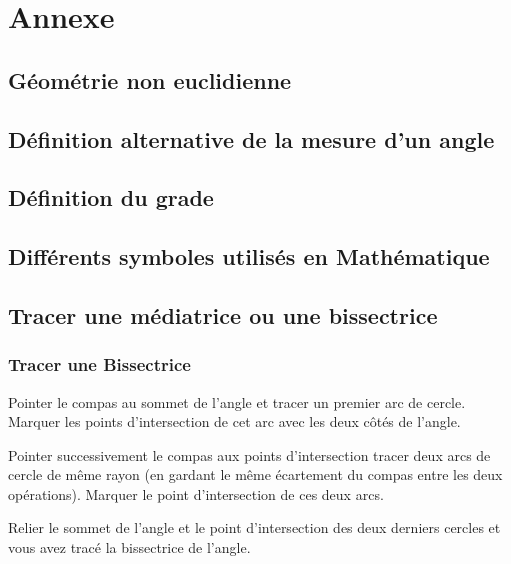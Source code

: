 \documentclass[a4paper, twoside]{article}
\begin{document}
\section{Annexe}

\subsection*{Géométrie non euclidienne} \label{geo_non_euclidienne}

\subsection*{Définition alternative de la mesure d'un angle} \label{autre_def_angle}

\subsection*{Définition du grade} \label{grade}


\subsection*{Différents symboles utilisés en Mathématique} \label{symboles_math}


\subsection*{Tracer une médiatrice ou une bissectrice} \label{tracer_mediatrice_bissectrice}

\subsubsection*{Tracer une Bissectrice}
Pointer le compas au sommet de l'angle et tracer un premier arc de cercle. Marquer les points d'intersection de cet arc avec les deux côtés de l'angle.

Pointer successivement le compas aux points d'intersection tracer deux arcs de cercle de même rayon (en gardant le même écartement du compas entre les deux opérations). Marquer le point d'intersection de ces deux arcs.

Relier le sommet de l'angle et le point d'intersection des deux derniers cercles et vous avez tracé la bissectrice de l'angle.
\end{document}

